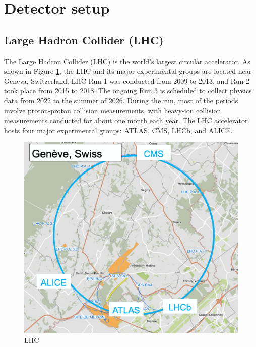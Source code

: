 \newpage
\clearpage
\section{Detector setup}
    \subsection{Large Hadron Collider (LHC)}
        The Large Hadron Collider (LHC) is the world's largest circular accelerator. As shown in Figure \ref{LHC}, the LHC and its major experimental groups are located near Geneva, Switzerland. LHC Run 1 was conducted from 2009 to 2013, and Run 2 took place from 2015 to 2018. The ongoing Run 3 is scheduled to collect physics data from 2022 to the summer of 2026. During the run, most of the periods involve proton-proton collision measurements, with heavy-ion collision measurements conducted for about one month each year. The LHC accelerator hosts four major experimental groups: ATLAS, CMS, LHCb, and ALICE.
        \begin{figure}[htbp]
            \centering
            \includegraphics[keepaspectratio, scale=0.2]{fig/2_1_LHC_detecter.png}
            \caption{LHC}
            \label{LHC}
        \end{figure}
